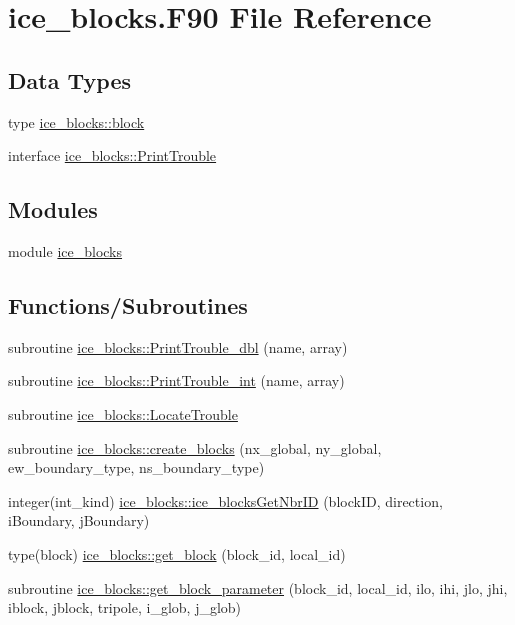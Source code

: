 \hypertarget{ice__blocks_8F90}{
\section{ice\_\-blocks.F90 File Reference}
\label{ice__blocks_8F90}
}
\subsection*{Data Types}
\begin{DoxyCompactItemize}
\item 
type \hyperlink{typeice__blocks_1_1block}{ice\_\-blocks::block}
\item 
interface \hyperlink{interfaceice__blocks_1_1PrintTrouble}{ice\_\-blocks::PrintTrouble}
\end{DoxyCompactItemize}
\subsection*{Modules}
\begin{DoxyCompactItemize}
\item 
module \hyperlink{namespaceice__blocks}{ice\_\-blocks}
\end{DoxyCompactItemize}
\subsection*{Functions/Subroutines}
\begin{DoxyCompactItemize}
\item 
subroutine \hyperlink{namespaceice__blocks_a844c65de0acaeb5796d6ce421b70c5c2}{ice\_\-blocks::PrintTrouble\_\-dbl} (name, array)
\item 
subroutine \hyperlink{namespaceice__blocks_a4a82607c32a256c67866525e0856b864}{ice\_\-blocks::PrintTrouble\_\-int} (name, array)
\item 
subroutine \hyperlink{namespaceice__blocks_a5ce0e098c40801be2e5f8f25d6f6af07}{ice\_\-blocks::LocateTrouble}
\item 
subroutine \hyperlink{namespaceice__blocks_aa2c09eaaef43d9cec6c1596979935f76}{ice\_\-blocks::create\_\-blocks} (nx\_\-global, ny\_\-global, ew\_\-boundary\_\-type, ns\_\-boundary\_\-type)
\item 
integer(int\_\-kind) \hyperlink{namespaceice__blocks_a62de204811a079f1cccdcc957f0cb1ff}{ice\_\-blocks::ice\_\-blocksGetNbrID} (blockID, direction, iBoundary, jBoundary)
\item 
type(block) \hyperlink{namespaceice__blocks_aa79bfef5022683234ed1b332af17f1de}{ice\_\-blocks::get\_\-block} (block\_\-id, local\_\-id)
\item 
subroutine \hyperlink{namespaceice__blocks_adbbafad5aa62ed6d9fec1934f073d23e}{ice\_\-blocks::get\_\-block\_\-parameter} (block\_\-id, local\_\-id, ilo, ihi, jlo, jhi, iblock, jblock, tripole, i\_\-glob, j\_\-glob)
\end{DoxyCompactItemize}
